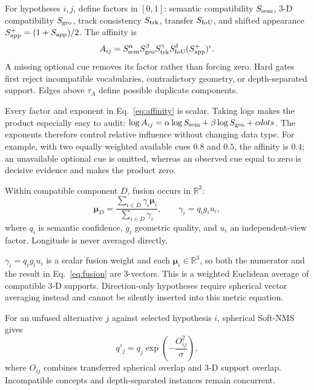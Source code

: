 \documentclass[a4paper,9pt]{extarticle}
\newcommand{\R}{\mathbb R}
\begin{document}
For hypotheses $i,j$, define factors in $[0,1]$: semantic compatibility $S_{\rm sem}$, 3-D compatibility $S_{\rm geo}$, track consistency $S_{\rm trk}$, transfer $S_{\rm IoU}$, and shifted appearance
$S_{\rm app}^+=(1+S_{\rm app})/2$. The affinity is
\begin{equation}
 A_{ij}=S_{\rm sem}^{\alpha}
 S_{\rm geo}^{\beta}
 S_{\rm trk}^{\gamma}
 S_{\rm IoU}^{\delta}
 (S_{\rm app}^{+})^{\epsilon}.
 \label{eq:affinity}
\end{equation}
A missing optional cue removes its factor rather than forcing zero. Hard gates first reject incompatible vocabularies, contradictory geometry, or depth-separated support. Edges above $\tau_A$ define possible duplicate components.

Every factor and exponent in Eq.~\ref{eq:affinity} is scalar. Taking logs makes
the product especially easy to audit:
$\log A_{ij}=\alpha\log S_{\rm sem}+\beta\log S_{\rm geo}+cdots$.
The exponents therefore control relative influence without changing data type.
For example, with two equally weighted available cues $0.8$ and $0.5$, the
affinity is $0.4$; an unavailable optional cue is omitted, whereas an observed
cue equal to zero is decisive evidence and makes the product zero.

Within compatible component $D$, fusion occurs in $\R^3$:
\begin{equation}
 \bm\mu_D=
 \frac{\sum_{i\in D}\gamma_i\bm\mu_i}
 {\sum_{i\in D}\gamma_i},
 \qquad
 \gamma_i=q_i g_i u_i,
 \label{eq:fusion}
\end{equation}
where $q_i$ is semantic confidence, $g_i$ geometric quality, and $u_i$ an independent-view factor. Longitude is never averaged directly.

$\gamma_i=q_i g_i u_i$ is a scalar fusion weight and each
$\bm\mu_i\in\R^3$, so both the numerator and the result in
Eq.~\ref{eq:fusion} are 3-vectors. This is a weighted Euclidean average of
compatible 3-D supports. Direction-only hypotheses require spherical vector
averaging instead and cannot be silently inserted into this metric equation.

For an unfused alternative $j$ against selected hypothesis $i$, spherical Soft-NMS gives
\begin{equation}
 q'_j=q_j\exp\!\left(-\frac{O_{ij}^2}{\sigma}\right),
 \label{eq:softnms}
\end{equation}
where $O_{ij}$ combines transferred spherical overlap and 3-D support overlap. Incompatible concepts and depth-separated instances remain concurrent.
\end{document}
